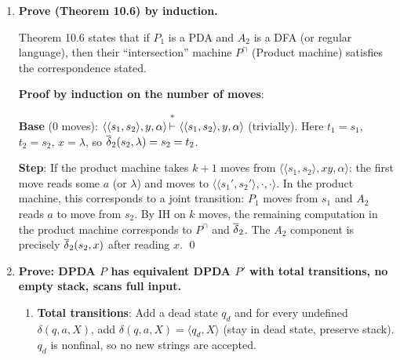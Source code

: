 \begin{enumerate}[{10.}1. ]
\textbf{Case 2}: $vx$ spans the $\pmb{a}$/$\pmb{b}$ boundary. Let $|vx|_{\pmb{a}}=\ell \geq 0$ and $|vx|_{\pmb{b}}=j \geq 1$ (at least one marked $\pmb{b}$). Choose $i - 1 = p!/j$ (an integer since $j \leq N < p$). Then the pumped string has $n = p + p! = p!+p$ and $m = p!+p$ (the $\pmb{c}$-block is untouched), so $n = m$, violating $n\neq m$. Contradiction.

\textbf{Case 3}: $vx$ spans the $\pmb{b}$/$\pmb{c}$ boundary. Let $|vx|_{\pmb{b}}=j \geq 1$ and $|vx|_{\pmb{c}}=r \geq 0$. Choose $i-1 = p!/j$. The pumped string has $n = p!+p$ and $k = p!+p$ (the $\pmb{a}$-block is untouched), so $k = n$, violating $k\neq n$. Contradiction. \qed

\item \textbf{Prove (Theorem 10.6) by induction.}

Theorem 10.6 states that if $P_1$ is a PDA and $A_2$ is a DFA (or regular language), then their ``intersection'' machine $P^{\cap}$ (Product machine) satisfies the correspondence stated.

\textbf{Proof by induction on the number of moves}:

\textbf{Base} (0 moves): $\langle\langle s_1,s_2\rangle,y,\alpha\rangle\Dvdash\langle\langle s_1,s_2\rangle,y,\alpha\rangle$ (trivially). Here $t_1=s_1$, $t_2=s_2$, $x=\lambda$, so $\overline{\delta}_2(s_2,\lambda)=s_2=t_2$. \checkmark

\textbf{Step}: If the product machine takes $k+1$ moves from $\langle\langle s_1,s_2\rangle,xy,\alpha\rangle$: the first move reads some $a$ (or $\lambda$) and moves to $\langle\langle s_1',s_2'\rangle,\cdot,\cdot\rangle$. In the product machine, this corresponds to a joint transition: $P_1$ moves from $s_1$ and $A_2$ reads $a$ to move from $s_2$. By IH on $k$ moves, the remaining computation in the product machine corresponds to $P^{\cap}$ and $\overline{\delta}_2$. The $A_2$ component is precisely $\overline{\delta}_2(s_2,x)$ after reading $x$. \qed

\item \textbf{Prove: DPDA $P$ has equivalent DPDA $P'$ with total transitions, no empty stack, scans full input.}

\begin{enumerate}
\item \textbf{Total transitions}: Add a dead state $q_d$ and for every undefined $\delta(q,a,X)$, add $\delta(q,a,X) = \langle q_d, X\rangle$ (stay in dead state, preserve stack). $q_d$ is nonfinal, so no new strings are accepted.


\end{enumerate}
\end{enumerate}
